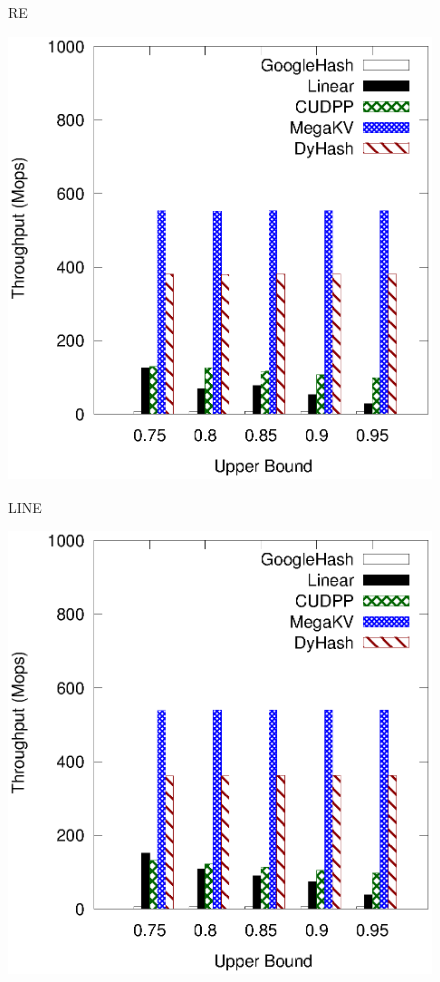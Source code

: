\begin{figure}[h]
\begin{minipage}{0.19\linewidth}
		\centerline{RE}
	\end{minipage}
	\hfill
	\begin{minipage}{0.19\linewidth}\centering
		\includegraphics[width=\linewidth]{pic/static-upper/upper_search_tpch.eps}
		\centerline{LINE}
	\end{minipage}
	\hfill
	\begin{minipage}{0.19\linewidth}\centering
		\includegraphics[width=\linewidth]{pic/static-upper/upper_search_random.eps}

\end{minipage}
\end{figure}
